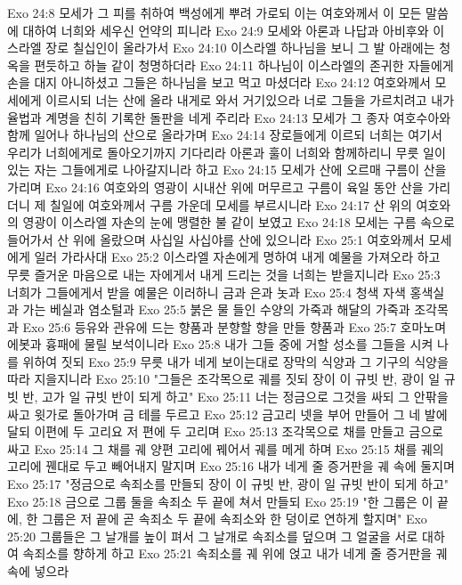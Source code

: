 Exo 24:8  모세가 그 피를 취하여 백성에게 뿌려 가로되 이는 여호와께서 이 모든 말씀에 대하여 너희와 세우신 언약의 피니라
Exo 24:9  모세와 아론과 나답과 아비후와 이스라엘 장로 칠십인이 올라가서
Exo 24:10  이스라엘 하나님을 보니 그 발 아래에는 청옥을 편듯하고 하늘 같이 청명하더라
Exo 24:11  하나님이 이스라엘의 존귀한 자들에게 손을 대지 아니하셨고 그들은 하나님을 보고 먹고 마셨더라
Exo 24:12  여호와께서 모세에게 이르시되 너는 산에 올라 내게로 와서 거기있으라 너로 그들을 가르치려고 내가 율법과 계명을 친히 기록한 돌판을 네게 주리라
Exo 24:13  모세가 그 종자 여호수아와 함께 일어나 하나님의 산으로 올라가며
Exo 24:14  장로들에게 이르되 너희는 여기서 우리가 너희에게로 돌아오기까지 기다리라 아론과 훌이 너희와 함께하리니 무릇 일이 있는 자는 그들에게로 나아갈지니라 하고
Exo 24:15  모세가 산에 오르매 구름이 산을 가리며
Exo 24:16  여호와의 영광이 시내산 위에 머무르고 구름이 육일 동안 산을 가리더니 제 칠일에 여호와께서 구름 가운데 모세를 부르시니라
Exo 24:17  산 위의 여호와의 영광이 이스라엘 자손의 눈에 맹렬한 불 같이 보였고
Exo 24:18  모세는 구름 속으로 들어가서 산 위에 올랐으며 사십일 사십야를 산에 있으니라
Exo 25:1  여호와께서 모세에게 일러 가라사대
Exo 25:2  이스라엘 자손에게 명하여 내게 예물을 가져오라 하고 무릇 즐거운 마음으로 내는 자에게서 내게 드리는 것을 너희는 받을지니라
Exo 25:3  너희가 그들에게서 받을 예물은 이러하니 금과 은과 놋과
Exo 25:4  청색 자색 홍색실과 가는 베실과 염소털과
Exo 25:5  붉은 물 들인 수양의 가죽과 해달의 가죽과 조각목과
Exo 25:6  등유와 관유에 드는 향품과 분향할 향을 만들 향품과
Exo 25:7  호마노며 에봇과 흉패에 물릴 보석이니라
Exo 25:8  내가 그들 중에 거할 성소를 그들을 시켜 나를 위하여 짓되
Exo 25:9  무릇 내가 네게 보이는대로 장막의 식양과 그 기구의 식양을 따라 지을지니라
Exo 25:10  "그들은 조각목으로 궤를 짓되 장이 이 규빗 반, 광이 일 규빗 반, 고가 일 규빗 반이 되게 하고"
Exo 25:11  너는 정금으로 그것을 싸되 그 안팎을 싸고 윗가로 돌아가며 금 테를 두르고
Exo 25:12  금고리 넷을 부어 만들어 그 네 발에 달되 이편에 두 고리요 저 편에 두 고리며
Exo 25:13  조각목으로 채를 만들고 금으로 싸고
Exo 25:14  그 채를 궤 양편 고리에 꿰어서 궤를 메게 하며
Exo 25:15  채를 궤의 고리에 꿴대로 두고 빼어내지 말지며
Exo 25:16  내가 네게 줄 증거판을 궤 속에 둘지며
Exo 25:17  "정금으로 속죄소를 만들되 장이 이 규빗 반, 광이 일 규빗 반이 되게 하고"
Exo 25:18  금으로 그룹 둘을 속죄소 두 끝에 쳐서 만들되
Exo 25:19  "한 그룹은 이 끝에, 한 그룹은 저 끝에 곧 속죄소 두 끝에 속죄소와 한 덩이로 연하게 할지며"
Exo 25:20  그룹들은 그 날개를 높이 펴서 그 날개로 속죄소를 덮으며 그 얼굴을 서로 대하여 속죄소를 향하게 하고
Exo 25:21  속죄소를 궤 위에 얹고 내가 네게 줄 증거판을 궤 속에 넣으라
